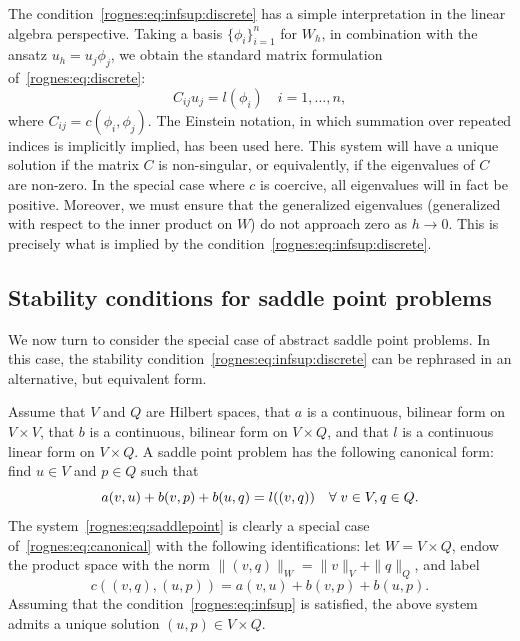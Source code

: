 The condition~\eqref{rognes:eq:infsup:discrete} has a simple
interpretation in the linear algebra perspective. Taking a basis
$\{\phi_i \}_{i=1}^n$ for $W_h$, in combination with the ansatz
$u_h = u_j \phi_j$, we obtain the standard matrix formulation
of~\eqref{rognes:eq:discrete}:
\begin{equation*}
  C_{ij} u_j = l(\phi_i) \quad i = 1, \dots, n,
\end{equation*}
where $C_{ij} = c(\phi_i, \phi_j)$. The Einstein notation, in which
summation over repeated indices is implicitly implied, has been used
here. This system will have a unique solution if the matrix $C$ is
non-singular, or equivalently, if the eigenvalues of $C$ are
non-zero. In the special case where $c$ is coercive, all eigenvalues
will in fact be positive. Moreover, we must ensure that the
generalized eigenvalues (generalized with respect to the inner product
on $W$) do not approach zero as $h \rightarrow 0$. This is precisely
what is implied by the condition~\eqref{rognes:eq:infsup:discrete}.

\subsection{Stability conditions for saddle point problems}

We now turn to consider the special case of abstract saddle point
problems. In this case, the stability
condition~\eqref{rognes:eq:infsup:discrete} can be rephrased in an
alternative, but equivalent form.

Assume that $V$ and $Q$ are Hilbert spaces, that $a$ is a continuous,
bilinear form on $V \times V$, that $b$ is a continuous, bilinear form
on $V \times Q$, and that $l$ is a continuous linear form on $V \times
Q$. A saddle point problem has the following canonical form: find $u
\in V$ and $p \in Q$ such that
\begin{equation}
    \label{rognes:eq:saddlepoint}
    a(v, u) + b(v, p) + b(u, q) = l((v, q))
    \quad \forall \; v \in V, q \in Q.
\end{equation}
The system~\eqref{rognes:eq:saddlepoint} is clearly a special case
of~\eqref{rognes:eq:canonical} with the following identifications: let
$W = V \times Q$, endow the product space with the norm $\|(v,
q)\|_{W} = \|v\|_{V} + \|q\|_{Q}$, and label
\begin{equation*}
  c((v, q), (u, p)) = a(v, u) + b(v, p) + b(u, p).
\end{equation*}
Assuming that the condition~\eqref{rognes:eq:infsup} is satisfied,
the above system admits a unique solution $(u, p) \in V \times Q$.

